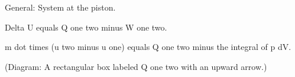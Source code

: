 General: System at the piston.  

Delta U equals Q one two minus W one two.  

m dot times (u two minus u one) equals Q one two minus the integral of p dV.  

(Diagram: A rectangular box labeled Q one two with an upward arrow.)